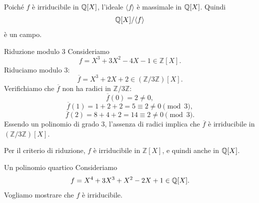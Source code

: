 \documentclass[a4paper]{article}
\begin{document}
\begin{snippetremark}{}
    Poiché \(f\) è irriducibile in \(\mathbb{Q}[X]\), l'ideale \(\langle f \rangle\) è massimale in \(\mathbb{Q}[X]\).
    Quindi
    \[
        \mathbb{Q}[X]/\langle f \rangle
    \]
    è un campo.
\end{snippetremark}

\begin{snippetexample}{Riduzione modulo \(3\)}
    Consideriamo
    \[
        f=X^3+3X^2-4X-1\in\mathbb{Z}[X].
    \]
    Riduciamo modulo \(3\):
    \[
        \overline{f}
        =
        X^3+2X+2
        \in(\mathbb{Z}/3\mathbb{Z})[X].
    \]
    Verifichiamo che \(\overline{f}\) non ha radici in \(\mathbb{Z}/3\mathbb{Z}\):
    \[
        \overline{f}(0)=2\neq 0,
    \]
    \[
        \overline{f}(1)=1+2+2=5\equiv 2\neq 0 \pmod 3,
    \]
    \[
        \overline{f}(2)=8+4+2=14\equiv 2\neq 0 \pmod 3.
    \]
    Essendo un polinomio di grado \(3\), l'assenza di radici implica che \(\overline{f}\) è irriducibile in \((\mathbb{Z}/3\mathbb{Z})[X]\).

    Per il criterio di riduzione, \(f\) è irriducibile in \(\mathbb{Z}[X]\), e quindi anche in \(\mathbb{Q}[X]\).
\end{snippetexample}

\begin{snippetexample}{Un polinomio quartico}
    Consideriamo
    \[
        f=X^4+3X^3+X^2-2X+1\in\mathbb{Q}[X].
    \]
    Vogliamo mostrare che \(f\) è irriducibile.
\end{snippetexample}
\end{document}
